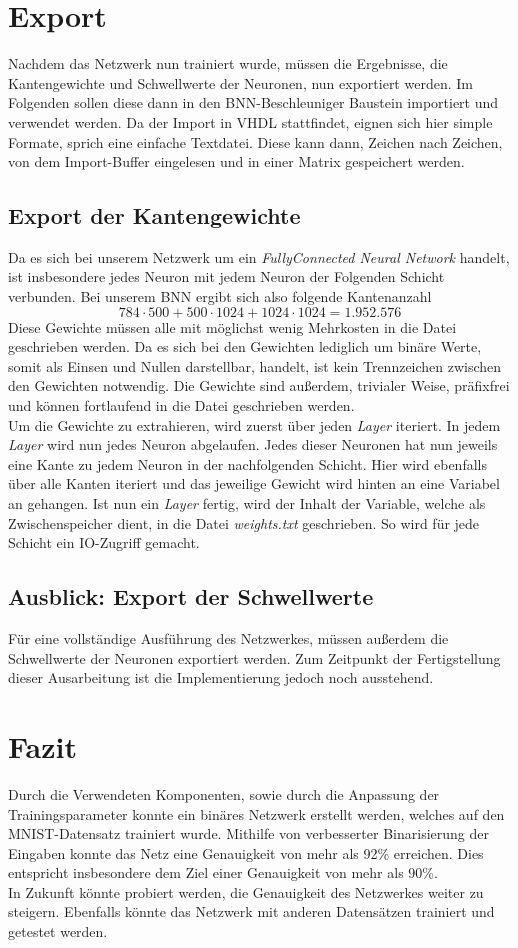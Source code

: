 \chapter{Export}
Nachdem das Netzwerk nun trainiert wurde, müssen die Ergebnisse, die Kantengewichte und Schwellwerte der Neuronen, nun exportiert werden. Im Folgenden sollen diese dann in den BNN-Beschleuniger Baustein importiert und verwendet werden. Da der Import in VHDL stattfindet, eignen sich hier simple Formate, sprich eine einfache Textdatei. Diese kann dann, Zeichen nach Zeichen, von dem Import-Buffer eingelesen und in einer Matrix gespeichert werden.
\section{Export der Kantengewichte}\label{exportKanten}
Da es sich bei unserem Netzwerk um ein \textit{FullyConnected Neural Network} handelt, ist insbesondere jedes Neuron mit jedem Neuron der Folgenden Schicht verbunden. Bei unserem BNN ergibt sich also folgende Kantenanzahl
\[784 \cdot 500 + 500 \cdot 1024 + 1024 \cdot 1024 = 1.952.576 \]
Diese Gewichte müssen alle mit möglichst wenig Mehrkosten in die Datei geschrieben werden. Da es sich bei den Gewichten lediglich um binäre Werte, somit als Einsen und Nullen darstellbar, handelt, ist kein Trennzeichen zwischen den Gewichten notwendig. Die Gewichte sind außerdem, trivialer Weise, präfixfrei und können fortlaufend in die Datei geschrieben werden.\\
Um die Gewichte zu extrahieren, wird zuerst über jeden \textit{Layer} iteriert. In jedem \textit{Layer} wird nun jedes Neuron abgelaufen. Jedes dieser Neuronen hat nun jeweils eine Kante zu jedem Neuron in der nachfolgenden Schicht. Hier wird ebenfalls über alle Kanten iteriert und das jeweilige Gewicht wird hinten an eine Variabel an gehangen. Ist nun ein \textit{Layer} fertig, wird der Inhalt der Variable, welche als Zwischenspeicher dient, in die Datei \textit{weights.txt} geschrieben. So wird für jede Schicht ein IO-Zugriff gemacht.
\section{Ausblick: Export der Schwellwerte}
Für eine vollständige Ausführung des Netzwerkes, müssen außerdem die Schwellwerte der Neuronen exportiert werden. Zum Zeitpunkt der Fertigstellung dieser Ausarbeitung ist die Implementierung jedoch noch ausstehend.
\chapter{Fazit}
Durch die Verwendeten Komponenten, sowie durch die Anpassung der Trainingsparameter konnte ein binäres Netzwerk erstellt werden, welches auf den MNIST-Datensatz trainiert wurde. Mithilfe von verbesserter Binarisierung der Eingaben konnte das Netz eine Genauigkeit von mehr als 92\% erreichen. Dies entspricht insbesondere dem Ziel einer Genauigkeit von mehr als 90\%.\\
In Zukunft könnte probiert werden, die Genauigkeit des Netzwerkes weiter zu steigern. Ebenfalls könnte das Netzwerk mit anderen Datensätzen trainiert und getestet werden.